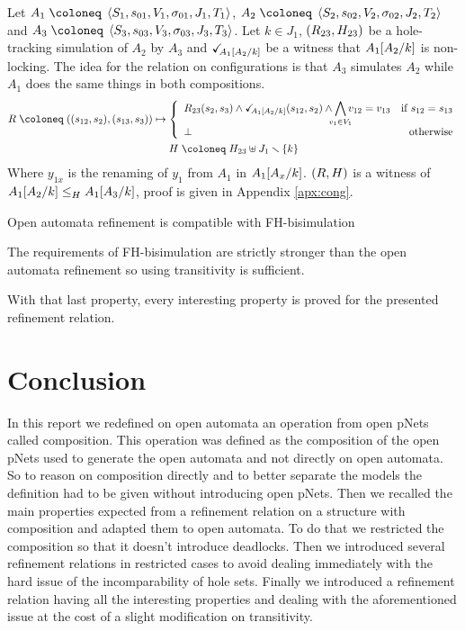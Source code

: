 \documentclass{article}
\begin{document}
Let \(A_1 \defobject \OAg[1]\), \(A_2 \defobject \OAg[2]\) and \(A_3 \defobject \OAg[3]\).
Let \(k \in J_1\), \(\mpar{R_{23}, H_{23}}\) be a hole-tracking simulation of \(A_2\) by \(A_3\) and \(\reach{A_1\subst{A_2}{k}}\) be a witness that \(A_1\subst{A_2}{k}\) is non-locking.
The idea for the relation on configurations is that \(A_3\) simulates \(A_2\) while \(A_1\) does the same things in both compositions.
\begin{gather*}
	R \defobject \mpar{\mpar{s_{12}, s_2}, \mpar{s_{13}, s_3}} \mapsto \choice{R_{23}\mpar{s_2, s_3} \wedge \reach{A_1\subst{A_2}{k}}\mpar{s_{12}, s_2} \wedge \bigwedge_\subbox{v_1 \in V_1} v_{12} = v_{13} & \text{if } s_{12} = s_{13} \\ \bot & \text{otherwise}} \\
	H \defobject H_{23} \uplus J_1 \setminus \mbrc{k}
\end{gather*}
Where \(y_{1x}\) is the renaming of \(y_1\) from \(A_1\) in \(A_1\subst{A_x}{k}\).
\(\mpar{R, H}\) is a witness of \(\wrel{A_1\subst{A_2}{k}}{A_1\subst{A_3}{k}}{H}\), proof is given in Appendix \ref{apx:cong}.
\begin{thm} Open automata refinement is compatible with FH-bisimulation \end{thm}
The requirements of FH-bisimulation are strictly stronger than the open automata refinement so using transitivity is sufficient.

With that last property, every interesting property is proved for the presented refinement relation.


\section{Conclusion}\label{sec:ccl}
In this report we redefined on open automata an operation from open pNets called composition.
This operation was defined as the composition of the open pNets used to generate the open automata and not directly on open automata.
So to reason on composition directly and to better separate the models the definition had to be given without introducing open pNets.
Then we recalled the main properties expected from a refinement relation on a structure with composition and adapted them to open automata.
To do that we restricted the composition so that it doesn't introduce deadlocks.
Then we introduced several refinement relations in restricted cases to avoid dealing immediately with the hard issue of the incomparability of hole sets.
Finally we introduced a refinement relation having all the interesting properties and dealing with the aforementioned issue at the cost of a slight modification on transitivity.
\end{document}
